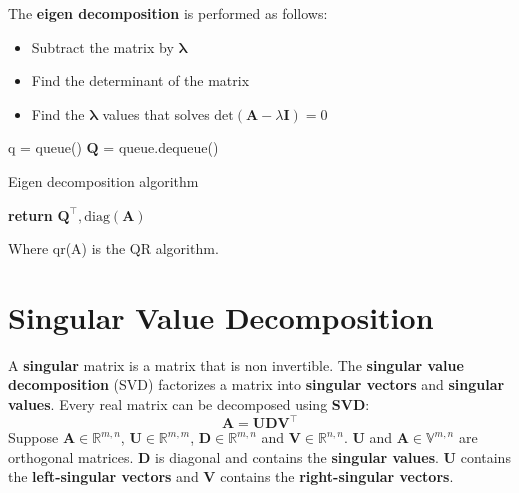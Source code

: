 \documentclass[12pt]{report}
\begin{document}
        The \textbf{eigen decomposition} is performed as follows:
        \begin{itemize}
            \item Subtract the matrix by $\boldsymbol{\lambda}$
            \item Find the determinant of the matrix
            \item Find the $\boldsymbol{\lambda}$ values that solves $\text{det}(\boldsymbol{A} - \lambda\boldsymbol{I}) = 0$
        \end{itemize}
        
        \begin{algorithm}[H]
            \SetAlgoLined
            \DontPrintSemicolon
            q = queue()\;
            $\boldsymbol{Q}$ = queue.dequeue()\;
            \caption{Eigen decomposition algorithm}
            \textbf{return} $\boldsymbol{Q}^\top, \text{diag}(\boldsymbol{A})$
        \end{algorithm}
        Where qr(A) is the QR algorithm.
    \section{Singular Value Decomposition}
        A \textbf{singular} matrix is a matrix that is non invertible.
        The \textbf{singular value decomposition} (SVD) factorizes a matrix into \textbf{singular vectors} and \textbf{singular values}. Every real matrix can be decomposed using \textbf{SVD}:
        \begin{equation}
            \boldsymbol{A} = \boldsymbol{U}\boldsymbol{D}\boldsymbol{V}^{\top}
        \end{equation}
        Suppose $\boldsymbol{A} \in \mathbb{R}^{m,n}$, $\boldsymbol{U} \in \mathbb{R}^{m,m}$, $\boldsymbol{D} \in \mathbb{R}^{m,n}$ and $\boldsymbol{V} \in \mathbb{R}^{n,n}$.
        $\boldsymbol{U}$ and $\boldsymbol{A} \in \mathbb{V}^{m,n}$ are orthogonal matrices. $\boldsymbol{D}$ is diagonal and contains the \textbf{singular values}.
        $\boldsymbol{U}$ contains the \textbf{left-singular vectors} and $\boldsymbol{V}$ contains the \textbf{right-singular vectors}.
        
\end{document}
